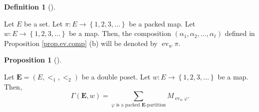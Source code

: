 \documentclass[numbers=enddot,12pt,final,onecolumn,notitlepage,abstracton]{scrartcl}
\theoremstyle{definition}
\newtheorem{prop}[theo]{Proposition}
\newenvironment{proposition}[1][]
{\begin{prop}[#1]\begin{leftbar}}
{\end{leftbar}\end{prop}}
\newtheorem{defi}[theo]{Definition}
\newenvironment{definition}[1][]
{\begin{defi}[#1]\begin{leftbar}}
{\end{leftbar}\end{defi}}
\let\sumnonlimits\sum
\renewcommand{\sum}{\sumnonlimits\limits}
\newcommand{\ev}{\operatorname{ev}}
\newcommand{\EE}{{\mathbf{E}}}
\begin{document}
\begin{definition}
Let $E$ be a set.
Let $\pi : E \to \left\{1, 2, 3, \ldots\right\}$ be a packed map.
Let $w : E \to \left\{1, 2, 3, \ldots\right\}$ be a map. Then, the
composition $\left(\alpha_1, \alpha_2, \ldots, \alpha_\ell\right)$
defined in Proposition \ref{prop.ev.comp} (b) will be denoted by
$\ev_w \pi$.
\end{definition}

\begin{proposition}
\label{prop.Gammaw.packed}
Let $\EE = \left(E, <_1, <_2\right)$ be a double poset. Let
$w : E \to \left\{1, 2, 3, \ldots\right\}$ be a map.
Then,
\begin{equation}
\label{eq.prop.Gammaw.packed}
\Gamma\left(\EE , w\right)
= \sum_{\varphi \text{ is a packed } \EE\text{-partition}}
M_{\ev_w \varphi} .
\end{equation}
\end{proposition}
\end{document}
